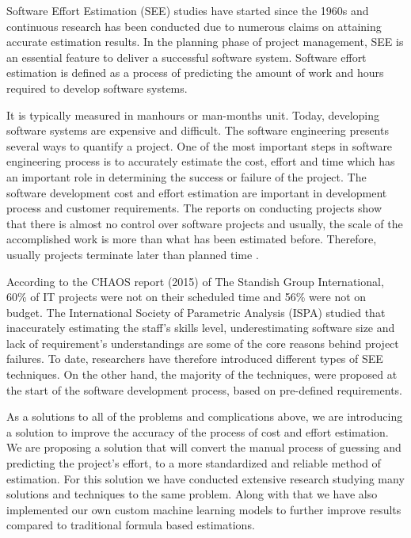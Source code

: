 Software Effort Estimation (SEE) studies have started since the 1960s and continuous research has been conducted due to numerous claims on attaining accurate
estimation results. In the planning phase
of project management, SEE is an essential feature to deliver a successful software
system. Software effort estimation is defined as a process of predicting the amount of
work and hours required to develop software systems. 

It is typically measured in manhours or man-months unit. Today, developing software systems are
expensive and difficult. The software engineering presents several ways to quantify a
project. One of the most important steps in software engineering process is to
accurately estimate the cost, effort and time which has an important role in determining
the success or failure of the project. The software development cost and effort
estimation are important in development process and customer requirements. The
reports on conducting projects show that there is almost no control over software
projects and usually, the scale of the accomplished work is more than what has been
estimated before. Therefore, usually projects terminate later than planned time .

According to the CHAOS report (2015) of The Standish Group International,
60\% of IT projects were not on their scheduled time and 56\% were not on budget. The
International Society of Parametric Analysis (ISPA) studied that inaccurately
estimating the staff’s skills level, underestimating software size and lack of
requirement’s understandings are some of the core reasons behind project failures. To date, researchers have therefore introduced different types of SEE
techniques. On the other hand, the majority of the techniques, were proposed at the
start of the software development process, based on pre-defined requirements.

As a solutions to all of the problems and complications above, we are introducing a solution to improve the accuracy of the process of cost and effort estimation. We are proposing a solution that will convert the manual process of guessing and predicting the project's effort, to a more standardized and reliable method of estimation. For this solution we have conducted extensive research studying many solutions and techniques to the same problem. Along with that we have also implemented our own custom machine learning models to further improve results compared to traditional formula based estimations. 












